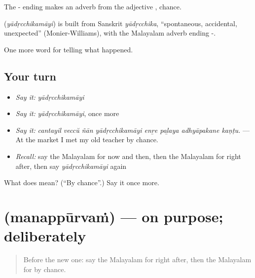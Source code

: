 The - ending makes an adverb from the adjective , chance.

\begin{cousinweb}
\textbf{} (\emph{yādṛcchikamāyi}) is built from Sanskrit \emph{yādṛcchika}, \textquotedblleft{}spontaneous, accidental, unexpected\textquotedblright{} (Monier-Williams), with the Malayalam adverb ending -.
\end{cousinweb}

\begin{grammarlens}[title={What you've built}]
One more word for telling what happened.
\end{grammarlens}

\subsection*{Your turn}
\begin{itemize}
\raggedright
  \item \emph{Say it:} \emph{yādṛcchikamāyi}
  \item \emph{Say it:} \emph{yādṛcchikamāyi}, once more
  \item \emph{Say it:} \emph{cantayil veccŭ ñān yādṛcchikamāyi enṟe paḻaya adhyāpakane kaṇṭu.} — At the market I met my old teacher by chance.
  \item \emph{Recall:} say the Malayalam for now and then, then the Malayalam for right after, then say \emph{yādṛcchikamāyi} again
\end{itemize}

\begin{tcolorbox}[breakable,colback=teal!4,colframe=teal!35!black,title={Before you move on}]
What does  mean? (\textquotedblleft{}By chance\textquotedblright{}.) Say it once more.
\end{tcolorbox}
\section[\texorpdfstring{\ml{മനപ്പൂർവം} (manappūrvaṁ)}{മനപ്പൂർവം (manappūrvaṁ)}]{ (manappūrvaṁ) — on purpose; deliberately}

\label{lesson:ML-C360-manappurvam}



\begin{quote}
Before the new one: say the Malayalam for right after, then the Malayalam for by chance.
\end{quote}

